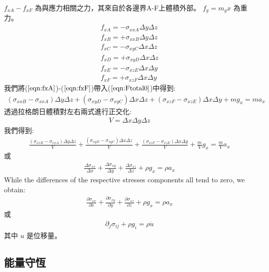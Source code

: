 $f_{xA}- f_{xF}$ 為與應力相關之力，其來自於各邊界A-F上體積外部。 
$f_g=m_gx$ 為重力。
\begin{align}
f_{xA} = -\sigma_{xxA}\Delta y\Delta z\label{eqn:fxA}\\
f_{xB} = +\sigma_{xxB}\Delta y\Delta z\label{eqn:fxB}\\
f_{xC} = -\sigma_{xyC}\Delta x\Delta z\label{eqn:fxC}\\
f_{xD} = +\sigma_{xyD}\Delta x\Delta z\label{eqn:fxD}\\
f_{xE} = -\sigma_{xzE}\Delta x\Delta y\label{eqn:fxE}\\
f_{xF} = +\sigma_{xzF}\Delta x\Delta y\label{eqn:fxF}
\end{align}
我們將($\ref{eqn:fxA}$)-($\ref{eqn:fxF}$)帶入($\ref{eqn:Ftotal0}$)中得到:
\begin{align}
(\sigma_{xxB}-\sigma_{xxA})\Delta y\Delta z+(\sigma_{xyD}-\sigma_{xyC})\Delta x\Delta z+(\sigma_{xzF}-\sigma_{xzE})\Delta x\Delta y+mg_x = ma_x 
\end{align}
透過拉格朗日體積對左右兩式進行正交化:
\begin{align}
V=\Delta x\Delta y\Delta z
\end{align}
我們得到:
\begin{align}
\frac{(\sigma_{xxB}-\sigma_{xxA})\Delta y\Delta z}{V}+\frac{(\sigma_{xyD}-\sigma_{xyC})\Delta x\Delta z}{V}+\frac{(\sigma_{xzF}-\sigma_{xzE})\Delta x\Delta y}{V}+\frac{m}{V}g_x=\frac{m}{V}a_x
\end{align}
或
\begin{align}
\frac{\Delta\sigma_{xx}}{\Delta x}+\frac{\Delta\sigma_{xy}}{\Delta y}+\frac{\Delta\sigma_{xz}}{\Delta z}+\rho g_x = \rho a_x
\end{align}
While the differences of the respective stresses components all tend to zero, we obtain:
\begin{align}
\frac{\partial\sigma_{xx}}{\partial x}+\frac{\partial\sigma_{xy}}{\partial y}+\frac{\partial\sigma_{xz}}{\partial z}+\rho g_x = \rho a_x
\end{align}
或
\begin{align}
\partial_j\sigma_{ij}+\rho g_i = \rho \ddot u
\end{align}
其中 $u$ 是位移量。
\subsection{能量守恆}

